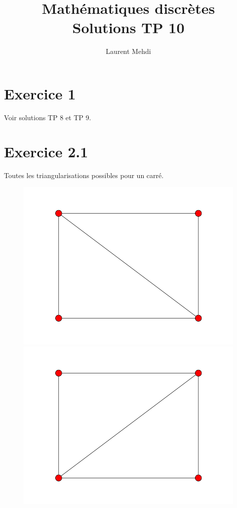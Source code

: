 \documentclass[fontsize=10pt]{article}
\title{\textbf{Mathématiques discrètes}\\ Solutions TP 10}
\author{Laurent Mehdi}
\date{}
\begin{document}
\maketitle

\section*{Exercice 1}
Voir solutions TP 8 et TP 9.

\section*{Exercice 2.1}
Toutes les triangularisations possibles pour un carré.
\begin{figure}[hbtp]
\centering
\includegraphics[scale=0.5]{imgs/carre/carre_1.png}
\includegraphics[scale=0.5]{imgs/carre/carre_2.png}
\end{figure}
\end{document}
